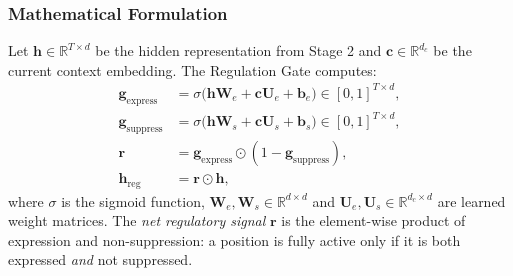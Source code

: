 \subsubsection{Mathematical Formulation}

Let $\mathbf{h} \in \mathbb{R}^{T \times d}$ be the hidden representation from Stage 2 and $\mathbf{c} \in \mathbb{R}^{d_c}$ be the current context embedding. The Regulation Gate computes:
\begin{align}
\mathbf{g}_{\text{express}} &= \sigma\bigl(\mathbf{h} \mathbf{W}_e + \mathbf{c} \mathbf{U}_e + \mathbf{b}_e\bigr) \in [0,1]^{T \times d}, \label{eq:express-gate} \\
\mathbf{g}_{\text{suppress}} &= \sigma\bigl(\mathbf{h} \mathbf{W}_s + \mathbf{c} \mathbf{U}_s + \mathbf{b}_s\bigr) \in [0,1]^{T \times d}, \label{eq:suppress-gate} \\
\mathbf{r} &= \mathbf{g}_{\text{express}} \odot (1 - \mathbf{g}_{\text{suppress}}), \label{eq:regulation-combined} \\
\mathbf{h}_{\text{reg}} &= \mathbf{r} \odot \mathbf{h}, \label{eq:regulated-output}
\end{align}
where $\sigma$ is the sigmoid function, $\mathbf{W}_e, \mathbf{W}_s \in \mathbb{R}^{d \times d}$ and $\mathbf{U}_e, \mathbf{U}_s \in \mathbb{R}^{d_c \times d}$ are learned weight matrices. The \emph{net regulatory signal} $\mathbf{r}$ is the element-wise product of expression and non-suppression: a position is fully active only if it is both expressed \emph{and} not suppressed.

